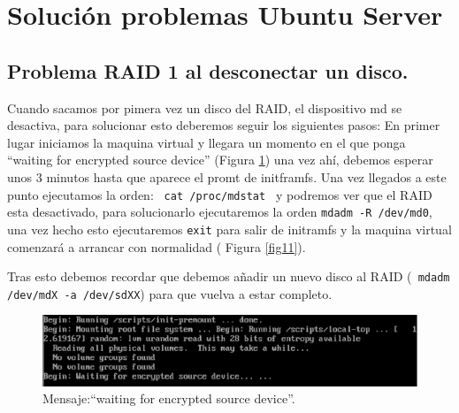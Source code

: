 \clearpage
\addappheadtotoc
\appendixpage

\appendix


\section{Solución problemas Ubuntu Server }
\subsection{Problema RAID 1 al desconectar un disco.}
Cuando sacamos por pimera vez un disco del RAID, el dispositivo md se desactiva, para solucionar esto deberemos seguir los siguientes pasos:
En primer lugar iniciamos la maquina virtual y llegara un momento en el que ponga ``waiting for encrypted source device'' (Figura \ref{fig10}) una vez ahí, debemos esperar unos 3 minutos hasta que aparece el promt de initframfs.
Una vez llegados a este punto ejecutamos la orden: \texttt{ cat /proc/mdstat } y podremos ver que el RAID esta desactivado, para solucionarlo ejecutaremos la orden \texttt{mdadm -R /dev/md0}, una vez hecho esto ejecutaremos \texttt{exit} para salir de initramfs y la maquina virtual comenzará a arrancar con normalidad ( Figura \ref{fig11}). \cite{manmdadm}

Tras esto debemos recordar que debemos añadir un nuevo disco al RAID (\texttt{ mdadm /dev/mdX -a /dev/sdXX}) para que vuelva a estar completo.

\begin{figure}[H]
    \begin{center}
        \includegraphics[scale=0.6]{Imagenes/waiting.eps}
        \caption{Mensaje:``waiting for encrypted source device''.}
        \label{fig10}
    \end{center}
\end{figure}

